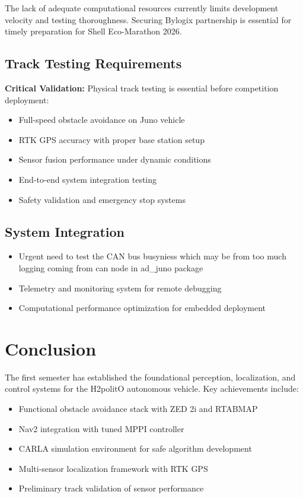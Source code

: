 The lack of adequate computational resources currently limits development velocity and testing thoroughness. Securing Bylogix partnership is essential for timely preparation for Shell Eco-Marathon 2026.

\subsection{Track Testing Requirements}
\textbf{Critical Validation:} Physical track testing is essential before competition deployment:
\begin{itemize}
    \item Full-speed obstacle avoidance on Juno vehicle
    \item RTK GPS accuracy with proper base station setup
    \item Sensor fusion performance under dynamic conditions
    \item End-to-end system integration testing
    \item Safety validation and emergency stop systems
\end{itemize}

\subsection{System Integration}
\begin{itemize}
    \item Urgent need to test the CAN bus busyniess which may be from too much logging coming from can node in ad_juno package
    \item Telemetry and monitoring system for remote debugging
    \item Computational performance optimization for embedded deployment
\end{itemize}

\section{Conclusion}
The first semester has established the foundational perception, localization, and control systems for the H2politO autonomous vehicle. Key achievements include:
\begin{itemize}
    \item Functional obstacle avoidance stack with ZED 2i and RTABMAP
    \item Nav2 integration with tuned MPPI controller
    \item CARLA simulation environment for safe algorithm development
    \item Multi-sensor localization framework with RTK GPS
    \item Preliminary track validation of sensor performance
\end{itemize}


